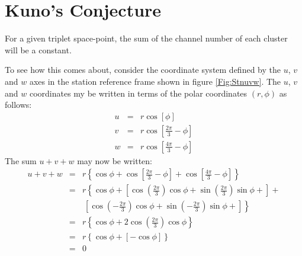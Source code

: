 \section{Kuno's Conjecture}
\label{App1Kuno}

For a given triplet space-point, the sum of the channel number of each
cluster will be a constant. 

To see how this comes about, consider the coordinate system defined by
the $u$, $v$ and $w$ axes in the station reference frame shown in
figure \ref{Fig:Stnuvw}.
The $u$, $v$ and $w$ coordinates my be written in terms of the polar
coordinates $(r, \phi)$ as follows:
\begin{eqnarray}
  u & = & r \cos [ \phi ]                                       \\
  v & = & r \cos \left[ \frac{2\pi}{3}-\phi \right]             \\
  w & = & r \cos \left[ \frac{4\pi}{3}-\phi \right]
\end{eqnarray}
The sum $u+v+w$ may now be written: 
\begin{eqnarray}
  u + v + w & = & r \left\{
                      \cos \phi  + 
                      \cos \left[ \frac{2\pi}{3}-\phi \right] + 
                      \cos \left[ \frac{4\pi}{3}-\phi \right] 
                    \right\}                                     \\
            & = & r \left\{
                      \cos \phi + 
                      \left[ 
                        \cos \left( \frac{2 \pi}{3} \right) \cos \phi +
                        \sin \left( \frac{2 \pi}{3} \right) \sin \phi +
                      \right] +        \right.                   \\
            &  &  ~ \left. \left[ 
                        \cos \left(-\frac{2 \pi}{3} \right) \cos \phi +
                        \sin \left(-\frac{2 \pi}{3} \right) \sin \phi +
                      \right] 
                    \right\}                                    \\
            & = & r \left\{
                      \cos \phi + 
                      2 \cos \left( \frac{2 \pi}{3} \right) \cos \phi
                    \right\}                                     \\
            & = & r \left\{
                      \cos \phi +
                      \left[ - \cos \phi \right]
                    \right\}                                     \\
            & = & 0
\end{eqnarray}
